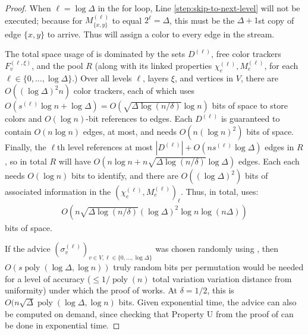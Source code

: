 \documentclass[10pt]{article}
\theoremstyle{definition}\newtheorem{definition}[lemma]{Definition}
\theoremstyle{remark}  \newtheorem*{remark}{Remark}
\DeclareMathOperator{\poly}{poly}
\newcommand{\pell}{{(\ell)}} %
\newcommand{\pellxi}{{(\ell,\xi)}} %
\begin{document}
\begin{proof}
  When $\ell = \log \Delta$ in the for loop, Line \ref{step:skip-to-next-level} will not be executed;
  because for $M_{\{x,y\}}^\pell$ to equal $2^\ell = \Delta$, this must be the $\Delta + 1$st copy of
  edge $\{x,y\}$ to arrive. Thus  will assign a color to every edge in
  the stream.
  
  The total space usage of  is dominated by the sets $D^\pell$, free color trackers $F^\pellxi_v$, and the pool $R$ (along with its linked properties $\chi^\pell_e,M^\pell_e$, for each $\ell \in \{0,\ldots,\log \Delta\}$.) Over all levels $\ell$, layers $\xi$, and vertices in $V$, there are
   $O((\log \Delta)^2 n)$ color trackers, each of which uses $O(s^\pell \log n+ \log \Delta) = O(\sqrt{\Delta \log(n/\delta)} \log n)$ bits of space to store colors and $O(\log n)$-bit references to edges.
  Each $D^\pell$ is guaranteed to contain $O(n \log n)$ edges, at most, and needs
  $O(n (\log n)^2)$ bits of space. Finally, the $\ell$th level references at most  $|D^\pell| + O(n s^\pell \log \Delta)$ edges in $R$, so in total $R$ will have $O( n \log n + n \sqrt{\Delta \log(n/\delta)} \log \Delta )$ edges. Each each needs $O(\log n)$ bits to identify, and there are
  $O((\log \Delta)^2)$ bits of associated information in the $(\chi^\pell_e,M^\pell_e)_{\ell}$.
  Thus, in total,  uses:
  \begin{align*}
    O(n \sqrt{\Delta \log(n /\delta)} (\log \Delta)^2  \log n \log(n\Delta))
  \end{align*}
  bits of space.
  
  If the advice $(\sigma_v^\pell)_{v \in V, \ell \in \{0,\ldots,\log \Delta\}}$ was chosen randomly
  using , then $O(s \poly(\log\Delta,\log n))$ truly random bits per permutation
  would be needed for a level of accuracy ($\le 1/\poly(n)$ total variation variation distance from 
  uniformity) under which the proof of  works. At $\delta = 1/2$,
  this is $O(n \sqrt{\Delta} \poly(\log\Delta,\log n)$ bits. Given exponential time, the
  advice can also be computed on demand, since checking that Property U from the proof of  can be done in exponential time. 
  
\end{proof}

\end{document}
